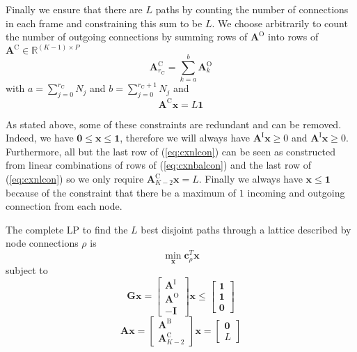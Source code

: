 \documentclass{article}
\newcommand{\cLP}{\boldsymbol{c}_{\rho}}
\newcommand{\BS}[1]{\boldsymbol{#1}}
\begin{document}
\begin{sloppy}
Finally we ensure that there are $L$ paths by counting the number of connections
in each frame and constraining this sum to be $L$. We choose arbitrarily to
count the number of outgoing connections by summing rows of $\BS{A}^{\text{O}}$
into rows of $\BS{A}^{\text{C}} \in \mathbb{R}^{(K-1) \times P}$
\begin{equation}
    \BS{A}^{\text{C}}_{r_{\text{C}}} = \sum_{k=a}^{b} \BS{A}^{\text{O}}_{k}
\end{equation}
with $a = \sum_{j=0}^{r_{\text{C}}} N_{j}$ and $b = \sum_{j=0}^{r_{\text{C}}+1}
N_{j}$ and
\begin{equation}
    \label{eq:cxnlcon}
    \BS{A}^{\text{C}}\BS{x} = L\BS{1}
\end{equation}

As stated above, some of these constraints are redundant and can be removed.
Indeed, we have $\BS{0} \leq \BS{x} \leq \BS{1}$, therefore we will always have
$\BS{A}^{\text{I}}\BS{x} \geq 0$ and $\BS{A}^{\text{I}}\BS{x} \geq 0$.
Furthermore, all but the last row of (\ref{eq:cxnlcon}) can be seen as
constructed from linear combinations of rows of (\ref{eq:cxnbalcon}) and the last
row of (\ref{eq:cxnlcon}) so we only require $\BS{A}^{\text{C}}_{K-2}\BS{x} = L$.
Finally we always have $\BS{x} \leq \BS{1}$ because of the constraint that there
be a maximum of $1$ incoming and outgoing connection from each node.

The complete LP to find the $L$ best disjoint paths through a lattice described
by node connections $\rho$ is
\[
    \min_{\BS{x}} \cLP^{T} \BS{x} 
\]
subject to
\[
    \BS{G}\BS{x} =
    \begin{bmatrix}
        \BS{A}^{\text{I}} \\
        \BS{A}^{\text{O}} \\
        -\BS{I}
    \end{bmatrix} \BS{x} \leq
    \begin{bmatrix}
        \BS{1} \\
        \BS{1} \\
        \BS{0}
    \end{bmatrix}
\]
\begin{equation}
    \BS{A}\BS{x} =
    \begin{bmatrix}
        \BS{A}^{\text{B}} \\
        \BS{A}^{\text{C}}_{K-2}
    \end{bmatrix} \BS{x} = 
    \begin{bmatrix}
        \BS{0} \\
        L
    \end{bmatrix}
\end{equation}


\end{sloppy}
\end{document}

